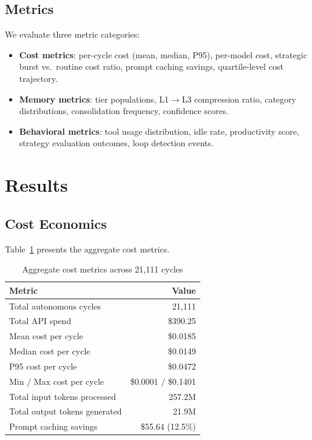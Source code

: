 \documentclass[11pt,a4paper]{article}
\begin{document}
\subsection{Metrics}

We evaluate three metric categories:

\begin{itemize}
    \item \textbf{Cost metrics}: per-cycle cost (mean, median, P95), per-model cost, strategic burst vs.\ routine cost ratio, prompt caching savings, quartile-level cost trajectory.
    \item \textbf{Memory metrics}: tier populations, L1$\to$L3 compression ratio, category distributions, consolidation frequency, confidence scores.
    \item \textbf{Behavioral metrics}: tool usage distribution, idle rate, productivity score, strategy evaluation outcomes, loop detection events.
\end{itemize}

\section{Results}
\label{sec:results}

\subsection{Cost Economics}

Table~\ref{tab:cost_summary} presents the aggregate cost metrics.

\begin{table}[h]
\centering
\caption{Aggregate cost metrics across 21,111 cycles}
\label{tab:cost_summary}
\begin{tabular}{@{}lr@{}}
\toprule
\textbf{Metric} & \textbf{Value} \\
\midrule
Total autonomous cycles & 21,111 \\
Total API spend & \$390.25 \\
Mean cost per cycle & \$0.0185 \\
Median cost per cycle & \$0.0149 \\
P95 cost per cycle & \$0.0472 \\
Min / Max cost per cycle & \$0.0001 / \$0.1401 \\
Total input tokens processed & 257.2M \\
Total output tokens generated & 21.9M \\
Prompt caching savings & \$55.64 (12.5\%) \\
\bottomrule
\end{tabular}
\end{table}
\end{document}
